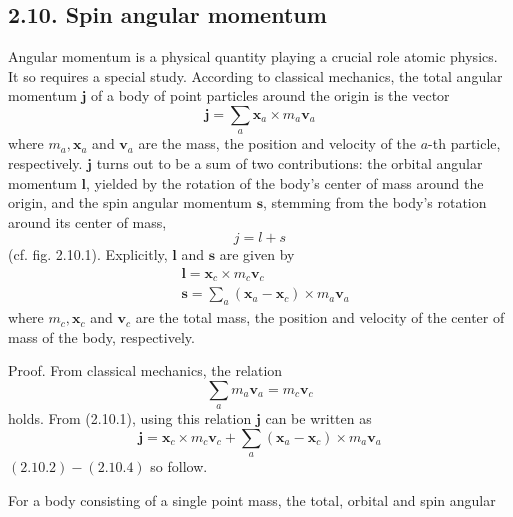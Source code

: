 \documentclass{article}
\begin{document}
\subsection*{2.10. Spin angular momentum}

Angular momentum is a physical quantity playing a crucial role atomic physics. It so requires a special study. According to classical mechanics, the total angular momentum $\boldsymbol{j}$ of a body of point particles around the origin is the vector
$$
\begin{equation*}
\boldsymbol{j}=\sum_{a} \boldsymbol{x}_{a} \times m_{a} \boldsymbol{v}_{a} \tag{2.10.1}
\end{equation*}
$$
where $m_{a}, \boldsymbol{x}_{a}$ and $\boldsymbol{v}_{a}$ are the mass, the position and velocity of the $a$-th particle, respectively. $\boldsymbol{j}$ turns out to be a sum of two contributions: the orbital angular momentum $\boldsymbol{l}$, yielded by the rotation of the body's center of mass around the origin, and the spin angular momentum $\boldsymbol{s}$, stemming from the body's rotation around its center of mass,
$$
\begin{equation*}
j=l+s \tag{2.10.2}
\end{equation*}
$$
(cf. fig. 2.10.1). Explicitly, $\boldsymbol{l}$ and $\boldsymbol{s}$ are given by
$$
\begin{align*}
& \boldsymbol{l}=\boldsymbol{x}_{c} \times m_{c} \boldsymbol{v}_{c}  \tag{2.10.3}\\
& \boldsymbol{s}=\sum_{a}\left(\boldsymbol{x}_{a}-\boldsymbol{x}_{c}\right) \times m_{a} \boldsymbol{v}_{a} \tag{2.10.4}
\end{align*}
$$
where $m_{c}, \boldsymbol{x}_{c}$ and $\boldsymbol{v}_{c}$ are the total mass, the position and velocity of the center of mass of the body, respectively.

Proof. From classical mechanics, the relation
$$
\begin{equation*}
\sum_{a} m_{a} \boldsymbol{v}_{a}=m_{c} \boldsymbol{v}_{c} \tag{2.10.5}
\end{equation*}
$$
holds. From (2.10.1), using this relation $\boldsymbol{j}$ can be written as
$$
\begin{equation*}
\boldsymbol{j}=\boldsymbol{x}_{c} \times m_{c} \boldsymbol{v}_{c}+\sum_{a}\left(\boldsymbol{x}_{a}-\boldsymbol{x}_{c}\right) \times m_{a} \boldsymbol{v}_{a} \tag{2.10.6}
\end{equation*}
$$
$(2.10 .2)-(2.10 .4)$ so follow.

For a body consisting of a single point mass, the total, orbital and spin angular
\end{document}
